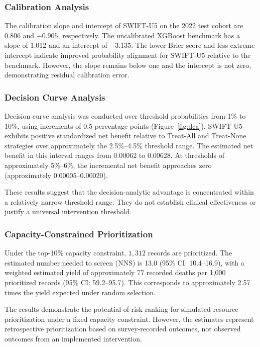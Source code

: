 \documentclass[a4paper,fleqn]{cas-sc}
\begin{document}
\subsubsection{Calibration Analysis}

The calibration slope and intercept of SWIFT-U5 on the 2022 test cohort are 0.806 and $-0.905$, respectively. The uncalibrated XGBoost benchmark has a slope of 1.012 and an intercept of $-3.135$. The lower Brier score and less extreme intercept indicate improved probability alignment for SWIFT-U5 relative to the benchmark. However, the slope remains below one and the intercept is not zero, demonstrating residual calibration error.

\subsubsection{Decision Curve Analysis}

Decision curve analysis was conducted over threshold probabilities from 1\% to 10\%, using increments of 0.5 percentage points (Figure~\ref{fig:dca}). SWIFT-U5 exhibits positive standardized net benefit relative to Treat-All and Treat-None strategies over approximately the 2.5\%--4.5\% threshold range. The estimated net benefit in this interval ranges from 0.00062 to 0.00628. At thresholds of approximately 5\%--6\%, the incremental net benefit approaches zero (approximately 0.00005--0.00020).

These results suggest that the decision-analytic advantage is concentrated within a relatively narrow threshold range. They do not establish clinical effectiveness or justify a universal intervention threshold.

\subsubsection{Capacity-Constrained Prioritization}

Under the top-10\% capacity constraint, $1{,}312$ records are prioritized. The estimated number needed to screen (NNS) is 13.0 (95\% CI: 10.4--16.9), with a weighted estimated yield of approximately 77 recorded deaths per 1,000 prioritized records (95\% CI: 59.2--95.7). This corresponds to approximately 2.57 times the yield expected under random selection.

The results demonstrate the potential of risk ranking for simulated resource prioritization under a fixed capacity constraint. However, the estimates represent retrospective prioritization based on survey-recorded outcomes, not observed outcomes from an implemented intervention.
\end{document}
